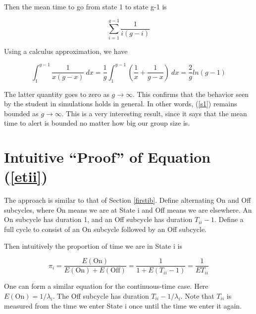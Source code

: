 \documentclass[11pt]{article}
\begin{document}
Then the mean time to go from state 1 to state g-1 is

\begin{equation}
\label{s1}
\sum_{i=1}^{g-1} \frac{1}{i(g-i)}
\end{equation}

Using a calculus approximation, we have

\begin{equation}
\int_1^{g-1} \frac{1}{x(g-x)} ~ dx = \frac{1}{g} \int_1^{g-1}
(\frac{1}{x} +
\frac{1}{g-x}) ~ dx = \frac{2}{g} ln(g-1)
\end{equation}

The latter quantity goes to zero as $g \rightarrow \infty$.  This
confirms that the behavior seen by the student in simulations holds in
general.  In other words, (\ref{s1}) remains bounded as $g \rightarrow
\infty$.  This is a very interesting result, since it says that the mean
time to alert is bounded no matter how big our group size is.

\appendix

\section{Intuitive ``Proof'' of Equation (\ref{etii})}  
\label{secondib} 

The approach is similar to that of Section \ref{firstib}.  Define
alternating On and Off subcycles, where On means we are at State i and
Off means we are elsewhere.  An On subcycle has duration 1, and an Off
subcycle has duration $T_{ii}-1$.  Define a full cycle to consist of an
On subcycle followed by an Off subcycle.  

Then intuitively the proportion of time we are in State i is 

\begin{equation}
\pi_i = \frac{E(\textrm{On})}{E(\textrm{On}) + E(\textrm{Off})} = \frac{1}{1+E(T_{ii}-1)} = \frac{1}{ET_{ii}}
\end{equation}

One can form a similar equation for the continuous-time case.  Here
$E(\textrm{On}) = 1/\lambda_i$.  The Off subcycle has duration
$T_{ii}-1/\lambda_i$.  Note that $T_{ii}$ is measured from the time we
enter State i once until the time we enter it again.
\end{document}
